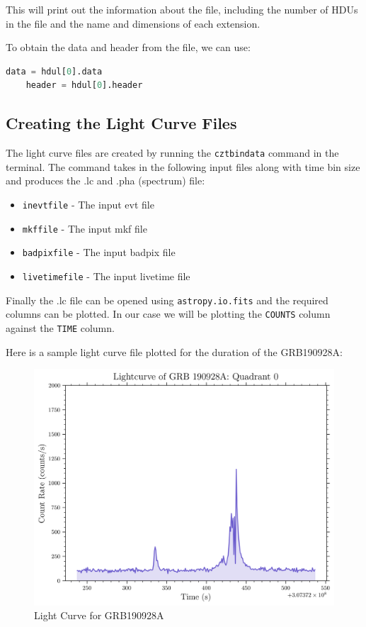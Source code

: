 \documentclass[11pt]{book} %
\begin{document}
This will print out the information about the file, including the number of HDUs in the file and the name and dimensions of each extension.

To obtain the data and header from the file, we can use:

\begin{lstlisting}[language=Python]
    data = hdul[0].data
    header = hdul[0].header
\end{lstlisting}


\subsection{Creating the Light Curve Files}

The light curve files are created by running the \lstinline[language=bash]{cztbindata} command in the terminal. The command takes in the following input files along with time bin size and produces the .lc and .pha (spectrum) file:

\begin{itemize}
    \item \lstinline[language=bash]{inevtfile} - The input evt file
    \item \lstinline[language=bash]{mkffile} - The input mkf file
    \item \lstinline[language=bash]{badpixfile} - The input badpix file
    \item \lstinline[language=bash]{livetimefile} - The input livetime file
\end{itemize}

Finally the .lc file can be opened using \lstinline[language=Python]{astropy.io.fits} and the required columns can be plotted. In our case we will be plotting the \lstinline[language=Python]{COUNTS} column against the \lstinline[language=Python]{TIME} column.

Here is a sample light curve file plotted for the duration of the GRB190928A:

\begin{figure}[H]
    \centering
    \includegraphics[scale=0.65]{Pictures/sample_lc.png}
    \caption{Light Curve for GRB190928A}
\end{figure}
\end{document}
